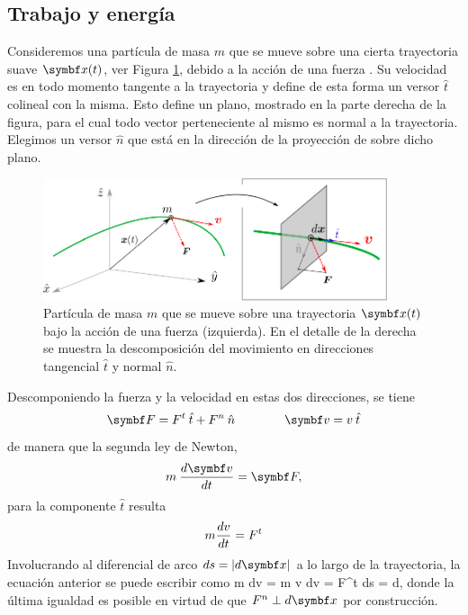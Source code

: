 \documentclass[10pt,oneside]{CBFT_book}
\begin{document}

\subsection{Trabajo y energía}

Consideremos una partícula de masa $ m $ que se mueve sobre una cierta trayectoria suave $\vb{x}(t)$, ver {Figura} 
\ref{fig_mc_workenergy}, debido a la acción de una fuerza .
Su velocidad  es en todo momento tangente a la trayectoria y define de esta forma un versor $ \hat{t} $
colineal con la misma. Esto define un plano, mostrado en la parte derecha de la figura, para el cual todo vector
perteneciente al mismo es normal a la trayectoria. Elegimos un versor $ \hat{n} $ que está en la dirección de
la proyección de  sobre dicho plano.

\begin{figure}[!h]
	\begin{center}
	\includegraphics[width=0.9\textwidth]{images/fig_mc_workandenergy.pdf}	
	\end{center}
	\caption{Partícula de masa $m$ que se mueve sobre una trayectoria $\vb{x}(t)$ bajo la acción de una fuerza 
 (izquierda). En el detalle de la derecha se muestra la descomposición del movimiento en direcciones
tangencial $\hat{t}$ y normal $\hat{n}$.}
	\label{fig_mc_workenergy}
\end{figure} 

Descomponiendo la fuerza y la velocidad en estas dos direcciones, se tiene 
\[
	\vb{F} = F^t \: \hat{t}  + F^n \: \hat{n} \qquad \qquad \vb{v} = v \: \hat{t}
\]
de manera que la segunda ley de Newton, 
\[
	m \: \dtot{\vb{v}}{t} = \vb{F},
\]
para la componente $\hat{t}$ resulta
\[
	m \frac{d^{\hspace{-0.05em}} {v}}{d {t}^{\hspace{-0.05em}}} = F^t
\]
Involucrando al diferencial de arco $ ds = | d\vb{x} | $ a lo largo de la trayectoria, la ecuación anterior se
puede escribir como
\be
	m \: dv \: = m \: v \: dv = F^t \: ds =  \cdot d,
	\label{ec_trabajo}
\ee
donde la última igualdad es posible en virtud de que $ F^n \perp d\vb{x} $ por construcción.
\end{document}
